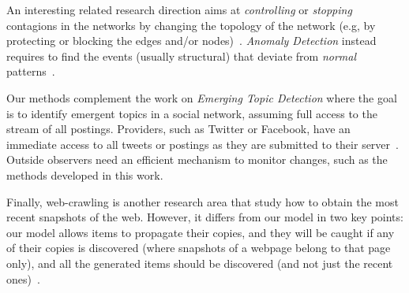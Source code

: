 An interesting related research direction aims at \emph{controlling} or
\emph{stopping} contagions in the networks by changing the topology of the
network (e.g, by protecting or blocking the edges and/or
nodes)~\cite{Aspnes2006,Kimura2008Minimizing,Kimura2008,Kimura2009,Li2011,He2011,Kuhlman2013}. %
\emph{Anomaly Detection} instead requires to find the events (usually
structural) that deviate from \emph{normal}
patterns~\cite{Noble2003,Sun2007,Eberle2007,Papadimitriou2010,Akoglu2010,Bogdanov2013}.

Our methods complement the work on \emph{Emerging Topic Detection} where the
goal is to identify emergent topics in a social network, assuming full access to
the stream of all postings. Providers, such as Twitter or Facebook, have an
immediate access to all tweets or postings as they are submitted to their
server~\cite{Cataldi2010,Mathioudakis2010}. Outside observers need an efficient
mechanism to monitor changes, such as the methods developed in this work.

Finally, web-crawling is another research area that study how to obtain the
most recent snapshots of the web. However, it differs from our model in two key
points: our model allows items to propagate their copies, and they will be
caught if any of their copies is discovered (where snapshots of a webpage belong
to that page only), and all the generated items should be discovered (and not
just the recent ones)~\cite{dasgupta2007discoverability,wolf2002optimal}.






